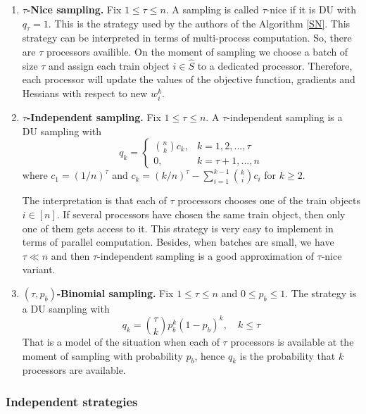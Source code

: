 \documentclass{article}
\theoremstyle{definition}
\theoremstyle{assumption}
\theoremstyle{lemma}
\theoremstyle{theorem}
\theoremstyle{proposition}
\begin{document}
	\begin{enumerate}
		\item \textbf{$\tau$-Nice sampling.}\label{nice} Fix $1 \leqslant \tau \leqslant n$. A sampling is called $\tau$-nice if it is DU with $q_\tau = 1$. This is the strategy used by the authors of the Algorithm \ref{SN}. This strategy can be interpreted in terms of multi-process computation. So, there are $\tau$ processors availible. On the moment of sampling we choose a batch of size $\tau$ and assign each train object $i \in \hat S$ to a dedicated processor. Therefore, each processor will update the values of the objective function, gradients and Hessians with respect to new $w_i^k$.
		
		\item \textbf{$\tau$-Independent sampling.}\label{tau-ind} Fix $1 \leqslant \tau \leqslant n$. A $\tau$-independent sampling is a DU sampling with 
		\begin{equation} 
			q_k = 
			\begin{cases}
				\binom{n}{k}c_k, & k = 1, 2, ..., \tau \\
				0, & k = \tau + 1, ..., n
			\end{cases}
		\end{equation}
		where $c_1 = (1/n)^\tau$ and $c_k = (k/n)^\tau - \sum \limits_{i=1}^{k-1} \binom{k}{i}c_i$ for $k \geqslant 2$.
		
		The interpretation is that each of $\tau$ processors chooses one of the train objects $i \in [n]$. If several processors have chosen the same train object, then only one of them gets access to it. This strategy is very easy to implement in terms of parallel computation. Besides, when batches are small, we have $\tau \ll n$ and then $\tau$-independent sampling is a good approximation of $\tau$-nice variant.
		
		\item \textbf{$(\tau, p_b)$-Binomial sampling.}\label{tau-bin} Fix $1 \leqslant \tau \leqslant n$ and $0 \leqslant p_b \leqslant 1$. The strategy is a DU sampling with
		\begin{equation}
			q_k = \binom{\tau}{k}p_b^k(1 - p_b)^k, \quad k \leqslant \tau
		\end{equation}
		That is a model of the situation when each of $\tau$ processors is available at the moment of sampling with probability $p_b$, hence $q_k$ is the probability that $k$ processors are available.
	\end{enumerate}

	\subsubsection{Independent strategies}
	
\end{document}
